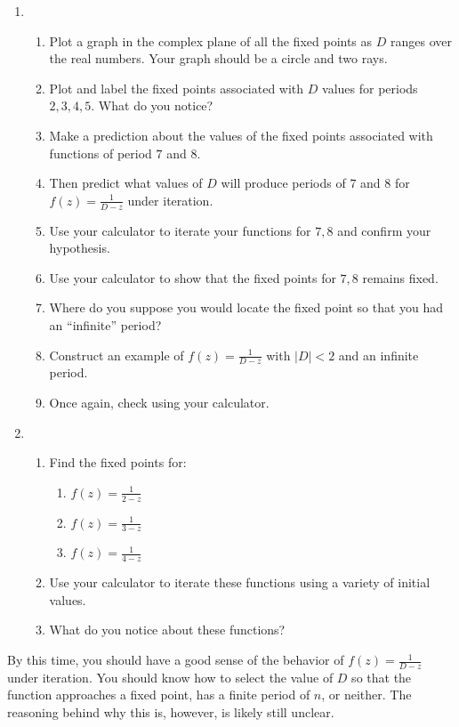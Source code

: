 \documentclass[../gatm.tex]{subfiles}
\begin{document}
\begin{enumerate}
\setcounter{enumi}{\value{problem_i}}
\item \begin{enumerate}
\item Plot a graph in the complex plane of all the fixed points as $D$ ranges over the real numbers. Your graph should be a circle and two rays.
\item Plot and label the fixed points associated with $D$ values for periods $2,3,4,5$. What do you notice?
\item Make a prediction about the values of the fixed points associated with functions of period $7$ and $8$.
\item Then predict what values of $D$ will produce periods of $7$ and $8$ for $f(z)=\frac{1}{D-z}$ under iteration.
\item Use your calculator to iterate your functions for $7,8$ and confirm your hypothesis.
\item Use your calculator to show that the fixed points for $7,8$ remains fixed.
\item Where do you suppose you would locate the fixed point so that you had an ``infinite'' period?
\item Construct an example of $f(z)=\frac{1}{D-z}$ with $|D|<2$ and an infinite period.
\item Once again, check using your calculator.
\end{enumerate}
\item \begin{enumerate}
\item Find the fixed points for: \begin{multicols}{3}
\begin{enumerate}
\item $f(z)=\frac{1}{2-z}$
\item $f(z)=\frac{1}{3-z}$
\item $f(z)=\frac{1}{4-z}$
\end{enumerate}
\end{multicols}
\item Use your calculator to iterate these functions using a variety of initial values.
\item What do you notice about these functions?
\end{enumerate}
\setcounter{problem_i}{\value{enumi}}
\end{enumerate}

\noindent By this time, you should have a good sense of the behavior of $f(z)=\frac{1}{D-z}$ under iteration. You should know how to select the value of $D$ so that the function approaches a fixed point, has a finite period of $n$, or neither. The reasoning behind why this is, however, is likely still unclear.
\end{document}
